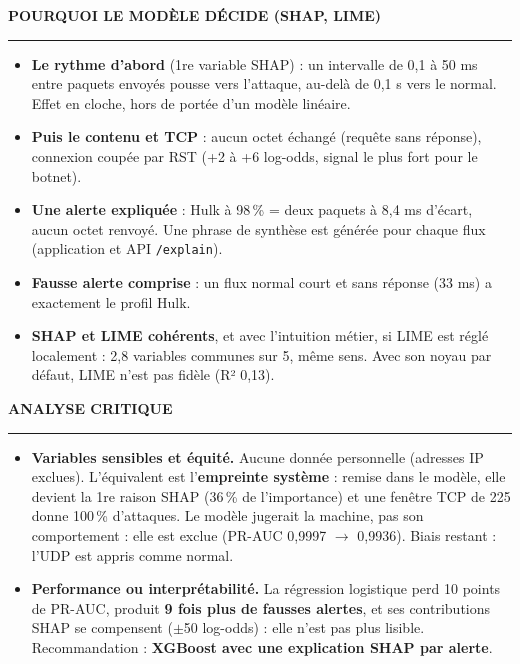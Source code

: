 \documentclass[10pt,a4paper]{article}
\newcommand{\rubrique}[1]{%
  \vspace{4pt}%
  {\color{orange}\bfseries\small\MakeUppercase{#1}}\par\vspace{-3pt}%
  {\color{trait}\rule{\linewidth}{0.5pt}}\par\vspace{1pt}}
\begin{document}
\begin{minipage}[t]{0.485\linewidth}

\rubrique{Pourquoi le modèle décide (SHAP, LIME)}
\begin{itemize}
  \item \textbf{Le rythme d'abord} (1re variable SHAP) : un intervalle de 0,1 à 50 ms entre paquets envoyés
        pousse vers l'attaque, au-delà de 0,1 s vers le normal. Effet en cloche, hors de portée d'un modèle linéaire.
  \item \textbf{Puis le contenu et TCP} : aucun octet échangé (requête sans réponse), connexion coupée par RST
        (+2 à +6 log-odds, signal le plus fort pour le botnet).
  \item \textbf{Une alerte expliquée} : Hulk à 98\,\% = deux paquets à 8,4 ms d'écart, aucun octet renvoyé.
        Une phrase de synthèse est générée pour chaque flux (application et API \texttt{/explain}).
  \item \textbf{Fausse alerte comprise} : un flux normal court et sans réponse (33 ms) a exactement le profil Hulk.
  \item \textbf{SHAP et LIME cohérents}, et avec l'intuition métier, si LIME est réglé localement : 2,8 variables
        communes sur 5, même sens. Avec son noyau par défaut, LIME n'est pas fidèle (R² 0,13).
\end{itemize}

\rubrique{Analyse critique}
\begin{itemize}
  \item \textbf{Variables sensibles et équité.} Aucune donnée personnelle (adresses IP exclues). L'équivalent est
        l'\textbf{empreinte système} : remise dans le modèle, elle devient la 1re raison SHAP (36\,\% de l'importance)
        et une fenêtre TCP de 225 donne 100\,\% d'attaques. Le modèle jugerait la machine, pas son comportement :
        elle est exclue (PR-AUC 0,9997 $\rightarrow$ 0,9936). Biais restant : l'UDP est appris comme normal.
  \item \textbf{Performance ou interprétabilité.} La régression logistique perd 10 points de PR-AUC, produit
        \textbf{9 fois plus de fausses alertes}, et ses contributions SHAP se compensent ($\pm$50 log-odds) :
        elle n'est pas plus lisible. Recommandation : \textbf{XGBoost avec une explication SHAP par alerte}.
\end{itemize}


\end{minipage}
\end{document}
